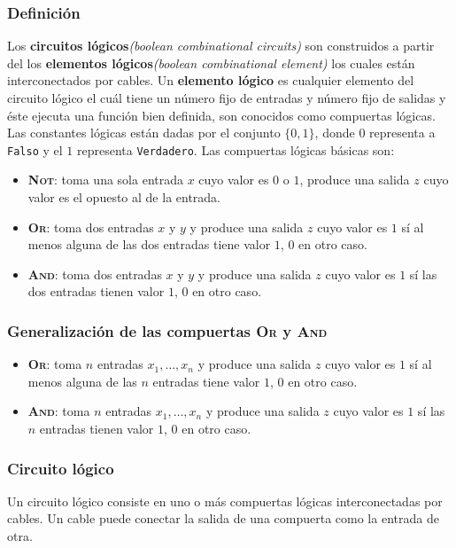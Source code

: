 \documentclass[a4paper]{article}
\begin{document}
\subsubsection{Definición}
\noindent
Los \textbf{circuitos lógicos}\textit{(boolean combinational circuits)} son construidos a partir 
del los \textbf{elementos lógicos}\textit{(boolean combinational element)} los cuales están interconectados por cables.
\newline 
Un \textbf{elemento lógico} es cualquier elemento del circuito lógico el cuál tiene un número fijo de entradas y número fijo 
de salidas y éste ejecuta una función bien definida, son conocidos como compuertas lógicas. Las constantes lógicas están dadas 
por el conjunto \(\{0,1\}\), donde \(0\) representa a \texttt{Falso} y el \(1\) representa \texttt{Verdadero}.
\newline 
Las compuertas lógicas básicas son:
\begin{itemize}
    \item \textbf{\textsc{Not}}: toma una sola entrada \(x\) cuyo valor es \(0\) o \(1\), produce una salida \(z\) cuyo valor es el opuesto al de la entrada.
    \item \textbf{\textsc{Or}}: toma dos entradas \(x\) y \(y\) y produce una salida \(z\) cuyo valor es \(1\) sí al menos alguna de las dos entradas tiene valor \(1\), \(0\) en otro caso.
    \item \textbf{\textsc{And}}: toma dos entradas \(x\) y \(y\) y produce una salida \(z\) cuyo valor es \(1\) sí las dos entradas tienen valor \(1\), \(0\) en otro caso.
\end{itemize}
\subsubsection{Generalización de las compuertas \textsc{Or} y \textsc{And}}
\begin{itemize}
    \item \textbf{\textsc{Or}}: toma \(n\) entradas \(x_{1}, \dotsc, x_{n}\) y produce una salida \(z\) cuyo valor es \(1\) sí al menos alguna de las \(n\) entradas tiene valor \(1\), \(0\) en otro caso.
    \item \textbf{\textsc{And}}: toma \(n\) entradas \(x_{1}, \dotsc, x_{n}\) y produce una salida \(z\) cuyo valor es \(1\) sí las \(n\) entradas tienen valor \(1\), \(0\) en otro caso.
\end{itemize}
\subsubsection{Circuito lógico}
\noindent
Un circuito lógico consiste en uno o más compuertas lógicas interconectadas por cables. Un cable puede conectar la salida de una compuerta como la entrada de otra. 
\end{document}
